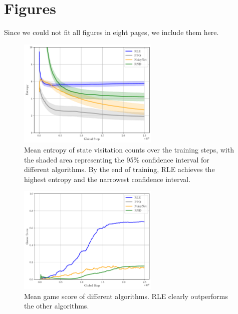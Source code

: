\appendix

\section{Figures}
Since we could not fit all figures in eight pages, we include them here.

\begin{figure}[h!]
  \centering
  \includegraphics[width=0.6\textwidth]{figures/gridworld_mean_entropy_state_visitation_algorithms.pdf}
  \caption{Mean entropy of state visitation counts over the training steps, with the shaded area representing the 95\% confidence interval for different algorithms. By the end of training, RLE achieves the highest entropy and the narrowest confidence interval.}
  \label{fig:gridworld-entropy-algorithms}
\end{figure}

\begin{figure}[h!]
  \centering
  \includegraphics[width=0.6\textwidth]{figures/gridworld_mean_game_score_algorithms.pdf}
  \caption{Mean game score of different algorithms. RLE clearly outperforms the other algorithms.}
  \label{fig:gridworld-score-algorithms}
\end{figure}

